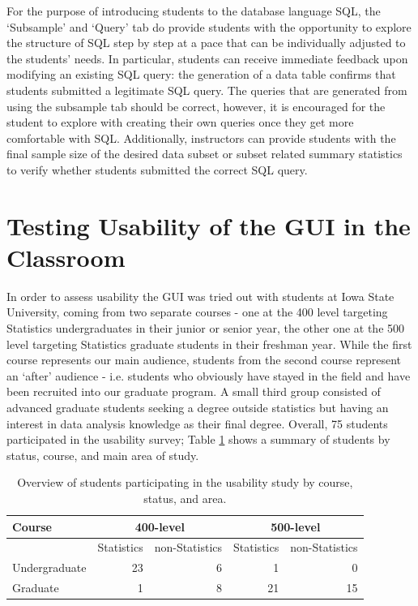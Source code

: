 \documentclass[11pt]{tise_style}
\begin{document}
For the purpose of introducing students to the database language SQL, the `Subsample' and `Query' tab do provide students with the opportunity to explore the structure of SQL step by step at a pace that can be individually adjusted to the students' needs. In particular, students can receive immediate feedback upon modifying an existing SQL query: the generation of a data table confirms that students submitted a legitimate SQL query.  The queries that are generated from using the subsample tab should be correct, however, it is encouraged for the student to explore with creating their own queries once they get more comfortable with SQL. Additionally, instructors can provide students with the final sample size of the desired data subset or subset related summary statistics to verify whether students submitted the correct SQL query.


\section{Testing Usability of the GUI in the Classroom}
\label{implement}
In order to assess usability the GUI was tried out with students at Iowa State University, coming from two separate courses - one at the 400 level targeting Statistics undergraduates in their junior or senior year, the other one at the 500 level targeting Statistics graduate students in their freshman year. While the first course represents  our main audience, students from the second course represent an `after' audience - i.e. students who obviously have stayed in the field and have been recruited into our graduate program.  A small third group consisted of advanced graduate students seeking a degree outside statistics but having an interest in data analysis knowledge as their final degree.  Overall, 75 students participated in the usability survey; Table \ref{fb-overview} shows a summary of students by status, course, and main area of study. 

\begin{table}[htbp]
   \centering
   \begin{tabular}{lrrrr} %
      \toprule
	Course  & \multicolumn{2}{c}{400-level} & \multicolumn{2}{c}{500-level} \\
      \midrule
      & Statistics & non-Statistics       & Statistics & non-Statistics \\
       \cmidrule(l){2-5}
      Undergraduate & 23 & 6 & 1 & 0 \\
      Graduate & 1 & 8 & 21 & 15 \\
      \bottomrule
   \end{tabular}
   \caption{Overview of students participating in the usability study by course, status, and area.}
   \label{fb-overview}
\end{table}
\end{document}
